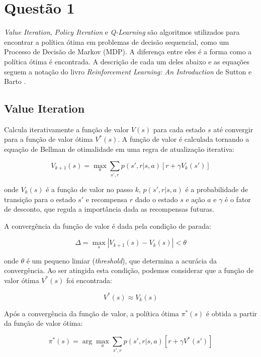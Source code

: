 \section*{Questão 1}

\textit{Value Iteration}, \textit{Policy Iteration} e \textit{Q-Learning} são algoritmos utilizados para encontrar a política ótima em problemas de decisão sequencial, como um Processo de Decisão de Markov (MDP). A diferença entre eles é a forma como a política ótima é encontrada. A descrição de cada um deles abaixo e as equações seguem a notação do livro \textit{Reinforcement Learning: An Introduction} de Sutton e Barto \cite{sutton2018reinforcement}.

\subsection*{Value Iteration}
Calcula iterativamente a função de valor $V(s)$ para cada estado $s$ até convergir para a função de valor ótima $V^*(s)$. A função de valor é calculada tornando a equação de Bellman de otimalidade em uma regra de atualização iterativa:

\begin{equation}
    V_{k+1}(s) = \max_a \sum_{s', r} p(s', r | s, a) [r + \gamma V_k(s')]
\end{equation}

onde $V_k(s)$ é a função de valor no passo $k$, $p(s', r | s, a)$ é a probabilidade de transição para o estado $s'$ e recompensa $r$ dado o estado $s$ e ação $a$ e $\gamma$ é o fator de desconto, que regula a importância dada as recompensas futuras.

A convergência da função de valor é dada pela condição de parada:

\begin{equation}
    \Delta = \max_s |V_{k+1}(s) - V_k(s)| < \theta
\end{equation}

onde $\theta$ é um pequeno limiar (\textit{threshold}), que determina a acurácia da convergência. Ao ser atingida esta condição, podemos considerar que a função de valor ótima $V^*(s)$ foi encontrada:

\begin{equation}
    V^*(s) \approx V_k(s)
\end{equation}

Após a convergência da função de valor, a política ótima $\pi^*(s)$ é obtida a partir da função de valor ótima:

\begin{equation}
    \pi^*(s) = \arg\max_a \sum_{s', r} p(s', r | s, a) [r + \gamma V^*(s')]
\end{equation}

